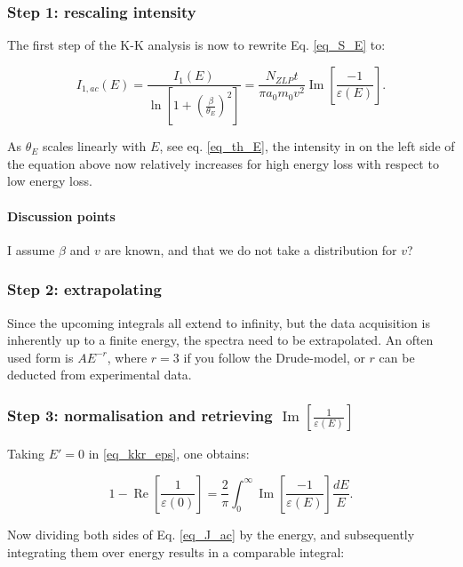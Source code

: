 \subsubsection{Step 1: rescaling intensity}
The first step of the K-K analysis is now to rewrite Eq. \eqref{eq_S_E} to:

\begin{equation}\label{eq_J_ac}
    I_{1,ac}(E) = \frac{I_1(E)}{\ln \left[1+\left(\frac{\beta}{\theta_{E}}\right)^{2}\right]} =\frac{N_{ZLP} t}{\pi a_{0} m_{0} v^{2}}  \operatorname{Im}\left[\frac{-1}{\varepsilon(E)}\right] .
\end{equation}


As $\theta_E$ scales linearly with $E$, see eq. \eqref{eq_th_E}, the intensity in on the left side of the equation above now relatively increases for high energy loss with respect to low energy loss.


\paragraph{Discussion points} I assume $\beta$ and $v$ are known, and that we do not take a distribution for $v$? 


\subsubsection{Step 2: extrapolating}
Since the upcoming integrals all extend to infinity, but the data acquisition is inherently up to a finite energy, the spectra need to be extrapolated. An often used form is $AE^{-r}$, where $r=3$ if you follow the Drude-model, or $r$ can be deducted from experimental data.



\subsubsection{Step 3: normalisation and retrieving $\operatorname{Im}\left[\frac{1}{\varepsilon(E)}\right]$}

Taking $E' = 0$ in \eqref{eq_kkr_eps}, one obtains:

\begin{equation}
    1-\operatorname{Re}\left[\frac{1}{\varepsilon(0)}\right]=\frac{2}{\pi} \int_{0}^{\infty} \operatorname{Im}\left[\frac{-1}{\varepsilon(E)}\right] \frac{d E}{E}.
\end{equation}

Now dividing both sides of Eq. \eqref{eq_J_ac} by the energy, and subsequently integrating them over energy results in a comparable integral:

